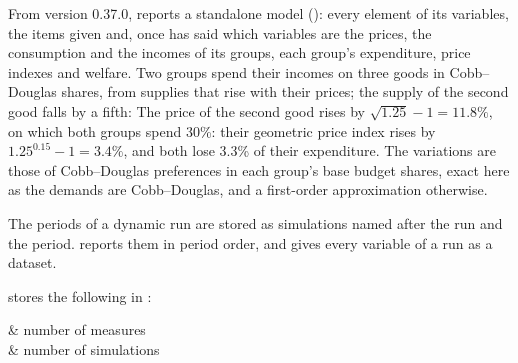 
From version 0.37.0,  reports a standalone model
(): every element of its variables, the items given and,
once  has said which variables are the prices, the
consumption and the incomes of its groups, each group's expenditure, price
indexes and welfare. Two groups spend their incomes on three goods in
Cobb--Douglas shares, from supplies that rise with their prices; the supply
of the second good falls by a fifth:
The price of the second good rises by $\sqrt{1.25} - 1 = 11.8\%$, on which
both groups spend 30\%: their geometric price index rises by $1.25^{0.15} - 1
= 3.4\%$, and both lose 3.3\% of their expenditure. The variations are
those of Cobb--Douglas preferences in each group's base budget shares, exact
here as the demands are Cobb--Douglas, and a first-order approximation
otherwise.


The periods of a dynamic run are stored as simulations named after the run and
the period.  reports them in period order, and
 gives every variable of a run as a dataset.


 stores the following in :
\begin{storedres}
 & number of measures\\
 & number of simulations\\
\end{storedres}


